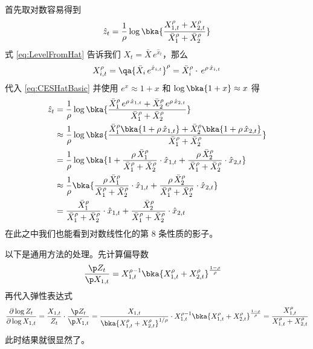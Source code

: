 首先取对数容易得到
\begin{equation}
    \hat z_t=\dfrac1\rho\log\bka{\dfrac{X^\rho_{1,t}+X^\rho_{2,t}}{\bar X_1^\rho+\bar X_2^\rho}}\label{eq:CESHatBasic}
\end{equation}
式 \ref{eq:LevelFromHat} 告诉我们 \(X_t=\bar X\,e^{\hat x_t}\)，那么
\begin{equation}
    X_{i,t}^\rho=\qa{\bar X_i\,e^{\hat x_{i,t}}}^\rho=\bar X_i^\rho\cdot \,e^{\rho\,\hat x_{i,t}}\label{eq:CESHatBasicX}
\end{equation}
代入 \ref{eq:CESHatBasic} 并使用 \(e^x\approx1+x\) 和 \(\log\bka{1+x}\approx x\) 得
\begin{align}
    \hat z_t&=\dfrac1\rho\log\bka{\dfrac{\bar X_1^\rho\,e^{\rho\,\hat x_{1,t}}+\bar X_2^\rho\,e^{\rho\,\hat x_{2,t}}}{\bar X_1^\rho+\bar X_2^\rho}}\notag\\
    &\approx\dfrac1\rho\log\bks{\dfrac{\bar X_1^\rho\bka{1+\rho\,\hat x_{1,t}}+\bar X_2^\rho\bka{1+\rho\,\hat x_{2,t}}}{\bar X_1^\rho+\bar X_2^\rho}}\notag\\
    &=\dfrac1\rho\log\bka{1+\dfrac{\rho\,\bar X_1^\rho}{\bar X_1^\rho+\bar X_2^\rho}\cdot\hat x_{1,t}+\dfrac{\rho\,\bar X_2^\rho}{\bar X_1^\rho+\bar X_2^\rho}\cdot\hat x_{2,t}}\notag\\
    &\approx\dfrac1\rho\bka{\dfrac{\rho\,\bar X_1^\rho}{\bar X_1^\rho+\bar X_2^\rho}\cdot\hat x_{1,t}+\dfrac{\rho\,\bar X_2^\rho}{\bar X_1^\rho+\bar X_2^\rho}\cdot\hat x_{2,t}}\notag\\
    &=\dfrac{\bar X_1^\rho}{\bar X_1^\rho+\bar X_2^\rho}\cdot\hat x_{1,t}+\dfrac{\bar X_2^\rho}{\bar X_1^\rho+\bar X_2^\rho}\cdot\hat x_{2,t}\notag
\end{align}
在此之中我们也能看到对数线性化的第 8 条性质的影子。


以下是通用方法的处理。先计算偏导数
\begin{align}
    \dfrac{\p Z_t}{\p X_{1,t}}&=X_{1,t}^{\rho-1}\bka{X_{1,t}^\rho+X_{2,t}^\rho}^{\frac{1-\rho}\rho}\notag
\end{align}
再代入弹性表达式
\begin{equation}
    \dfrac{\partial\log Z_t}{\partial\log X_{1,t}}=\dfrac{X_{1,t}}{Z_t}\cdot\dfrac{\p Z_t}{\p X_{1,t}}=\dfrac{X_{1,t}}{\bka{X_{1,t}^\rho+X_{2,t}^\rho}^{1/\rho}}\cdot X_{1,t}^{\rho-1}\bka{X_{1,t}^\rho+X_{2,t}^\rho}^{\frac{1-\rho}\rho}=\dfrac{X_{1,t}^\rho}{X_{1,t}^\rho+X_{2,t}^\rho}\notag
\end{equation}
此时结果就很显然了。

